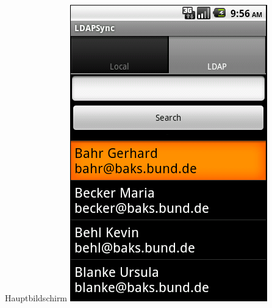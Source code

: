\documentclass[hyperref={bookmarksopen=false}]{beamer}
\begin{document}
\begin{frame}[fragile]
\begin{block}{Hauptbildschirm}
	\vspace{1 cm}
	\includegraphics[scale=0.3]{LDAPTabView.png}
	\end{block}
\end{frame}
\end{document}

